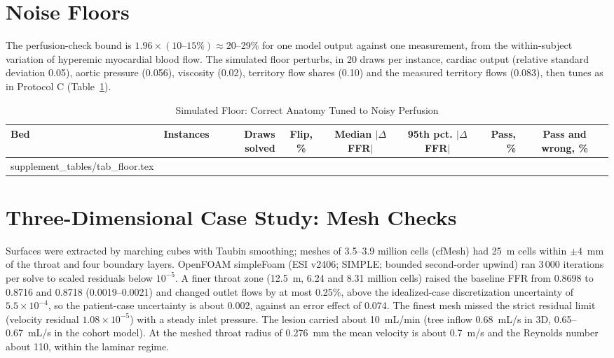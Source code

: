 \documentclass[journal,twoside,web,onecolumn]{ieeecolor}
\begin{document}
\FloatBarrier
{}
\section{Noise Floors}\label{sec:floor}
The perfusion-check bound is $1.96 \times (10\text{--}15\%) \approx 20$--29\% for one model output against one
measurement, from the within-subject variation of hyperemic myocardial blood flow. The simulated floor perturbs,
in 20 draws per instance, cardiac output (relative standard deviation 0.05), aortic pressure (0.056), viscosity (0.02),
territory flow shares (0.10) and the measured territory flows (0.083), then tunes as in Protocol C
(Table~\ref{tab:floor}).
\begin{table}[!ht]
\caption{Simulated Floor: Correct Anatomy Tuned to Noisy Perfusion}\label{tab:floor}
\centering\footnotesize
\begin{tabular}{@{}lrrcccrc@{}}
\toprule
Bed & Instances & Draws solved & Flip, \% & Median $|\Delta$FFR$|$ & 95th pct. $|\Delta$FFR$|$ & Pass, \% &
Pass and wrong, \%\\
\midrule
{} supplement_tables/tab_floor.tex 
\bottomrule
\end{tabular}
\end{table}

\FloatBarrier
{}
\section{Three-Dimensional Case Study: Mesh Checks}\label{sec:cfd}
Surfaces were extracted by marching cubes with Taubin smoothing; meshes of 3.5--3.9 million cells (cfMesh) had
25~\textmu m cells within $\pm 4$~mm of the throat and four boundary layers. OpenFOAM simpleFoam (ESI v2406; SIMPLE;
bounded second-order upwind) ran 3\,000 iterations per solve to scaled residuals below $10^{-5}$. A finer throat zone (12.5~\textmu m, 6.24 and 8.31 million cells) raised the baseline FFR from 0.8698 to 0.8716 and 0.8718
(0.0019--0.0021) and changed outlet flows by at most 0.25\%, above the idealized-case discretization uncertainty of $5.5\times10^{-4}$,
so the patient-case uncertainty is about 0.002, against an error effect of 0.074. The finest mesh missed the strict residual limit (velocity residual $1.08\times10^{-5}$) with a steady inlet pressure. The lesion carried about 10~mL/min (tree inflow 0.68~mL/s in 3D, 0.65--0.67~mL/s in the cohort model). At the meshed throat radius of 0.276~mm the mean velocity is about 0.7~m/s and the Reynolds number about 110, within the laminar regime.
\end{document}
